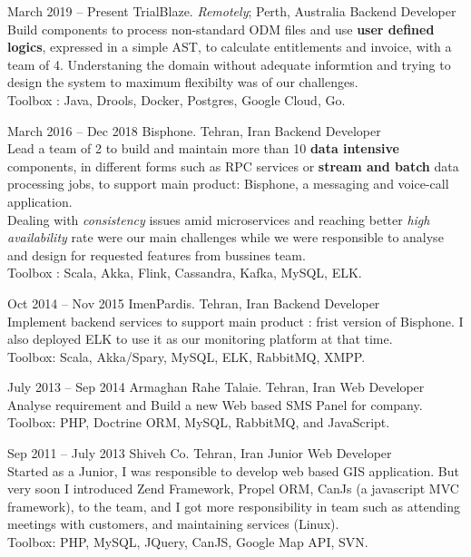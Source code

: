 \documentclass{tccv}
\begin{document}
\begin{eventlist}

\item{March 2019 -- Present}
  {TrialBlaze. \emph{Remotely}; Perth, Australia}
  {Backend Developer}
  \\Build components to process non-standard ODM files and use \textbf{user defined logics}, expressed in a simple AST, to calculate entitlements and invoice, with a team of 4. Understaning the domain without adequate informtion and trying to design the system to maximum flexibilty was of our challenges.\\Toolbox : Java, Drools, Docker, Postgres, Google Cloud, Go.

\item{March 2016 -- Dec 2018}
  {Bisphone. Tehran, Iran}
  {Backend Developer}
  \\Lead a team of 2 to build and maintain more than 10 \textbf{data intensive} components, in different forms such as RPC services or \textbf{stream and batch} data processing jobs, to support main product: Bisphone, a messaging and voice-call application.\\Dealing with \textit{consistency} issues amid microservices and reaching better \textit{high availability} rate were our main challenges while we were responsible to analyse and design for requested features from bussines team.\\Toolbox : Scala, Akka, Flink, Cassandra, Kafka, MySQL, ELK.

\item{Oct 2014 -- Nov 2015}
  {ImenPardis. Tehran, Iran}
  {Backend Developer}
  \\Implement backend services to support main product : frist version of Bisphone. I also deployed ELK to use it as our monitoring platform at that time.\\Toolbox: Scala, Akka/Spary, MySQL, ELK, RabbitMQ, XMPP.

\item{July 2013 -- Sep 2014}
  {Armaghan Rahe Talaie. Tehran, Iran}
  {Web Developer}
  \\Analyse requirement and Build a new Web based SMS Panel for company.\\Toolbox: PHP, Doctrine ORM, MySQL, RabbitMQ, and JavaScript.

\item{Sep 2011 -- July 2013}
  {Shiveh Co. Tehran, Iran}
  {Junior Web Developer}
  \\Started as a Junior, I was responsible to develop web based GIS application. But very soon I introduced Zend Framework, Propel ORM, CanJs (a javascript MVC framework), to the team, and I got more responsibility in team such as attending meetings with customers, and maintaining services (Linux).\\Toolbox: PHP, MySQL, JQuery, CanJS, Google Map API, SVN.

\end{eventlist}
\end{document}
